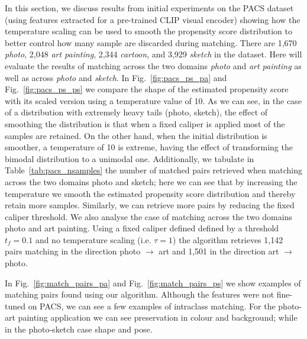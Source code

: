In this section, we discuss results from initial experiments on the PACS
dataset~\citep{li2017deeper} (using features extracted for a pre-trained CLIP
\citep{radford2021learning} visual encoder) showing how the temperature scaling can be used to
smooth the propensity score distribution to better control how many sample are discarded during
matching. 
% 
There are 1,670 \emph{photo}, 2,048 \emph{art painting}, 2,344 \emph{cartoon}, and 3,929
\emph{sketch} in the dataset. Here will evaluate the results of matching across the two domains
\emph{photo} and \emph{art painting} as well as across \emph{photo} and \emph{sketch}.
% 
In Fig.~\ref{fig:pacs_ps_pa} and Fig.~\ref{fig:pacs_ps_ps} we compare the shape of the estimated
propensity score with its scaled version using a temperature value of 10. 
%
As we can see, in the case of a distribution with extremely heavy tails (photo, sketch), the effect
of smoothing the distribution is that when a fixed caliper is applied most of the samples are
retained. 
%
On the other hand, when the initial distribution is smoother, a temperature of 10 is extreme,
having the effect of transforming the bimodal distribution to a unimodal one.
% 
Additionally, we tabulate in Table~\ref{tab:pacs_nsamples} the number of matched pairs retrieved
when matching across the two domains photo and sketch; here we can see that by increasing the
temperature we smooth the estimated propensity score distribution and thereby retain more samples.
%
Similarly, we can retrieve more pairs by reducing the fixed caliper threshold. 
%
We also analyse the case of matching across the two domains photo and art painting. Using a fixed
caliper defined defined by a threshold \( t_f = 0.1 \) and no temperature scaling (i.e. $\tau=1$) the
algorithm retrieves 1,142 pairs matching in the direction photo $\to$ art and 1,501 in the
direction art $\to$ photo. 
% 

In Fig.~\ref{fig:match_pairs_pa} and Fig.~\ref{fig:match_pairs_ps} we show examples of matching
pairs found using our \CNN{} algorithm. Although the features were not fine-tuned on PACS, we can
see a few examples of intraclass matching. For the photo-art painting application we can see
preservation in colour and background; while in the photo-sketch case shape and pose.

